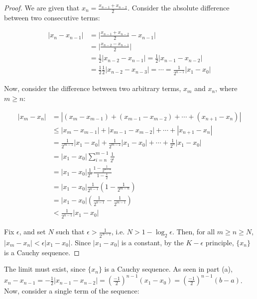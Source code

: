 \begin{proof}
We are given that $x_n = \frac{x_{n - 1} + x_{n - 2}}{2}$. Consider the absolute difference between two consecutive terms:

\begin{align*}
  |x_n - x_{n - 1}| &= \Big|\frac{x_{n - 1} + x_{n - 2}}{2} - x_{n - 1}\Big| \\
  &= \Big|\frac{x_{n - 2} - x_{n - 1}}{2}\Big| \\
  &= \frac{1}{2}|x_{n - 2} - x_{n - 1}| = \frac{1}{2}|x_{n - 1} - x_{n - 2}| \\
  &= \frac{1}{2}\frac{1}{2}|x_{n - 2} - x_{n - 3}| = \cdots = \frac{1}{2^{n - 1}}|x_1 - x_0|
\end{align*}

Now, consider the difference between two arbitrary terms, $x_m$ and $x_n$, where $m \geq n$:

\begin{align*}
  |x_m - x_n| &= |(x_m - x_{m - 1}) + (x_{m - 1} - x_{m - 2}) + \cdots + (x_{n + 1} - x_n)| \\
  &\leq |x_m - x_{m - 1}| + |x_{m - 1} - x_{m - 2}| + \cdots + |x_{n + 1} - x_n| \\
  &= \frac{1}{2^{m - 1}}|x_1 - x_0| + \frac{1}{2^{m - 2}}|x_1 - x_0| + \cdots + \frac{1}{2^n}|x_1 - x_0| \\
  &= |x_1 - x_0|\sum_{i = n}^{m - 1} \frac{1}{2^i} \\
  &= |x_1 - x_0|\frac{1}{2^n}\frac{1 - \frac{1}{2^{m - n}}}{1 - \frac{1}{2}} \\
  &= |x_1 - x_0|\frac{1}{2^{n - 1}}\left(1 - \frac{1}{2^{m - n}}\right) \\
  &= |x_1 - x_0|\left(\frac{1}{2^{n - 1}} - \frac{1}{2^{m - 1}}\right) \\
  &< \frac{1}{2^{n - 1}}|x_1 - x_0|
\end{align*}

Fix $\epsilon$, and set $N$ such that $\epsilon > \frac{1}{2^{N - 1}}$, i.e. $N > 1 - \log_2 \epsilon$. Then, for all $m \geq n \geq N$, $|x_m - x_n| < \epsilon|x_1 - x_0|$. Since $|x_1 - x_0|$ is a constant, by the $K-\epsilon$ principle, $\{x_n\}$ is a Cauchy sequence.
\end{proof}

The limit must exist, since $\{x_n\}$ is a Cauchy sequence. As seen in part (a), $x_n - x_{n - 1} = -\frac{1}{2}|x_{n - 1} - x_{n - 2}| = \left(\frac{-1}{2}\right)^{n - 1}(x_1 - x_0) = \left(\frac{-1}{2}\right)^{n - 1}(b - a)$. Now, consider a single term of the sequence:

